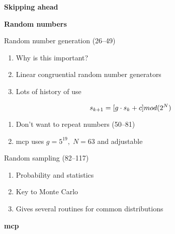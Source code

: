 \documentclass[aspectratio=1610,pdftex,dvipsnames,compress,xcolor={dvipsnames}]{beamer}
\newcommand{\acs}{\acrshort} %
\begin{document}
\begin{frame}[plain]{}
    \centering\LARGE\textbf{Skipping ahead}
\end{frame}


\begin{frame}[plain]{}
    \centering\LARGE\textbf{Random numbers}
\end{frame}


\addtocounter{framenumber}{-2} 
\begin{frame}{Random number generation (26--49)}
    \begin{enumerate}[series=outerlist,topsep=0pt,itemsep=21pt,leftmargin=*,label=(\arabic*)]
        \item[]Why is this important?
        \item[]Linear congruential random number generators
        \item[]Lots of history of use
    \end{enumerate}

    \vspace*{\fill}

    \begin{equation}
        \LARGE
        s_{k+1} = [g \cdot s_k + c] mod(2^N)
    \end{equation}

    \vspace*{\fill}

    \begin{enumerate}[series=outerlist,topsep=0pt,itemsep=21pt,leftmargin=*,label=(\arabic*)]
        \item[]Don't want to repeat numbers (50--81)
        \item[]\acs{mcp} uses $g = 5^{19}, \; N = 63$ and adjustable
    \end{enumerate}
\end{frame}


\begin{frame}{Random sampling (82--117)}
    \begin{enumerate}[series=outerlist,topsep=0pt,itemsep=21pt,leftmargin=*,label=(\arabic*)]
        \item[]Probability and statistics
        \item[]Key to Monte Carlo
        \item[]Gives several routines for common distributions
    \end{enumerate}
\end{frame}


\begin{frame}[plain]{}
    \centering\LARGE\textbf{\acs{mcp}}
\end{frame}
\end{document}
